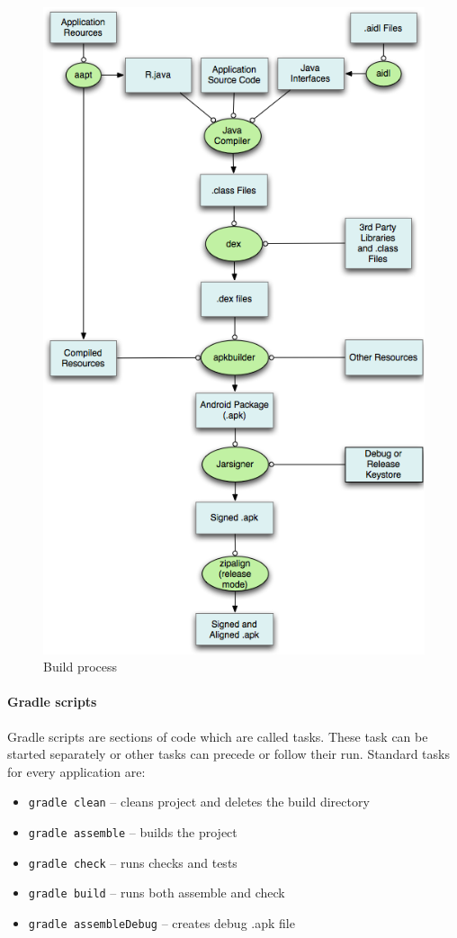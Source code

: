 \begin{figure}[h!]
    \centering
    \includegraphics[scale=0.45]{fig/build.png}
    \caption{Build process \cite{AndroidDev}}
\end{figure}

\paragraph{Gradle scripts}

Gradle scripts are sections of code which are called tasks. These task can be started separately or other tasks can
precede or follow their run. Standard tasks for every application are:
\begin{itemize}
  \item \texttt{gradle clean} -- cleans project and deletes the build directory
  \item \texttt{gradle assemble} -- builds the project
  \item \texttt{gradle check} -- runs checks and tests
  \item \texttt{gradle build} -- runs both assemble and check
  \item \texttt{gradle assembleDebug} -- creates debug .apk file
\end{itemize}
